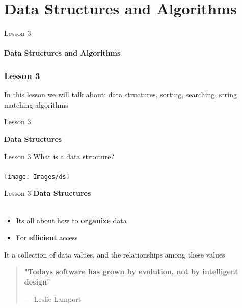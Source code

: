 \documentclass[aspectratio=1610]{beamer}
\begin{document}
\section{Data Structures and Algorithms}

\begin{frame}
\begin{center}
\Huge Lesson 3\\~\\
\textbf{Data Structures and Algorithms}
\end{center}
\end{frame}



\begin{frame}
\frametitle{Lesson 3}

\Huge In this lesson we will talk about:
 \alert{data structures, sorting, searching, string matching algorithms}
\end{frame}



\begin{frame}{Lesson 3}{}
\begin{center}
\Huge \textbf{Data Structures}
\end{center}
\end{frame}


\begin{frame}{Lesson 3}{}
\Huge{What is a data structure?}\\~\\
\texttt{[image: Images/ds]}
\end{frame}



\begin{frame}{Lesson 3}{}
\LARGE
\textbf{Data Structures}\\~\\
\begin{itemize}
    \item Its all about how to \textbf{organize} data
    \item For \textbf{efficient} access
\end{itemize}

It a collection of data values, and the relationships among these values
\end{frame}


\begin{frame}
\begin{center}
\Huge
\begin{quote}
\textbf{"Todays software has grown by evolution, not by intelligent design"}
\begin{flushright}
{--- Leslie Lamport}	
\end{flushright}
\end{quote}
\end{center}
\end{frame}
\end{document}

